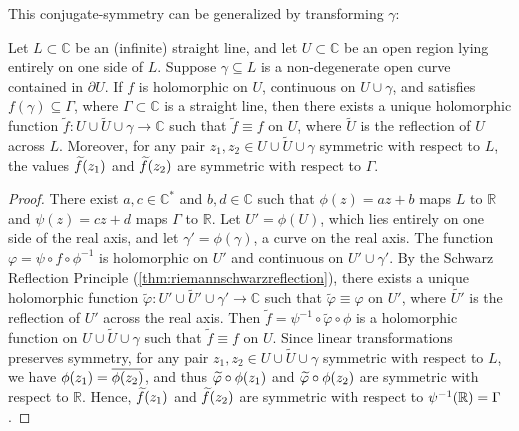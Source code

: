 This conjugate-symmetry can be generalized by transforming \(\gamma\):
\begin{theorem}
    Let \(L\subset\mathbb{C}\) be an (infinite) straight line, and let \(U\subset\mathbb{C}\) be an open region lying entirely on one side of \(L\). Suppose \(\gamma\subseteq L\) is a non-degenerate open curve contained in \(\partial U\). If \(f\) is holomorphic on \(U\), continuous on \(U\cup\gamma\), and satisfies \(f(\gamma)\subseteq\Gamma\), where \(\Gamma\subset\mathbb{C}\) is a straight line, then there exists a unique holomorphic function \(\widetilde{f}:U\cup\widetilde{U}\cup\gamma\to\mathbb{C}\) such that \(\widetilde{f}\equiv f\) on \(U\), where \(\widetilde{U}\) is the reflection of \(U\) across \(L\). Moreover, for any pair \(z_1,z_2\in U\cup\widetilde{U}\cup\gamma\) symmetric with respect to \(L\), the values \(\widetilde{f}\qty(z_1)\) and \(\widetilde{f}\qty(z_2)\) are symmetric with respect to \(\Gamma\).
\end{theorem}
\begin{proof}
    There exist \(a,c\in\mathbb{C}^*\) and \(b,d\in\mathbb{C}\) such that \(\phi(z)=az+b\) maps \(L\) to \(\mathbb{R}\) and \(\psi(z)=cz+d\) maps \(\Gamma\) to \(\mathbb{R}\). Let \(U'=\phi(U)\), which lies entirely on one side of the real axis, and let \(\gamma'=\phi(\gamma)\), a curve on the real axis. The function \(\varphi=\psi\circ f\circ\phi^{-1}\) is holomorphic on \(U'\) and continuous on \(U'\cup\gamma'\). By the Schwarz Reflection Principle (\cref{thm:riemannschwarzreflection}), there exists a unique holomorphic function \(\widetilde{\varphi}:U'\cup\widetilde{U}'\cup\gamma'\to\mathbb{C}\) such that \(\widetilde{\varphi}\equiv\varphi\) on \(U'\), where \(\widetilde{U'}\) is the reflection of \(U'\) across the real axis. Then \(\widetilde{f}=\psi^{-1}\circ\widetilde{\varphi}\circ\phi\) is a holomorphic function on \(U\cup\widetilde{U}\cup\gamma\) such that \(\widetilde{f}\equiv f\) on \(U\). Since linear transformations preserves symmetry, for any pair \(z_1,z_2\in U\cup\widetilde{U}\cup\gamma\) symmetric with respect to \(L\), we have \(\phi\qty(z_1)=\overline{\phi\qty(z_2)}\), and thus \(\widetilde{\varphi}\circ\phi\qty(z_1)\) and \(\widetilde{\varphi}\circ\phi\qty(z_2)\) are symmetric with respect to \(\mathbb{R}\). Hence, \(\widetilde{f}\qty(z_1)\) and \(\widetilde{f}\qty(z_2)\) are symmetric with respect to \(\psi^{-1}\qty(\mathbb{R})=\Gamma\).
\end{proof}